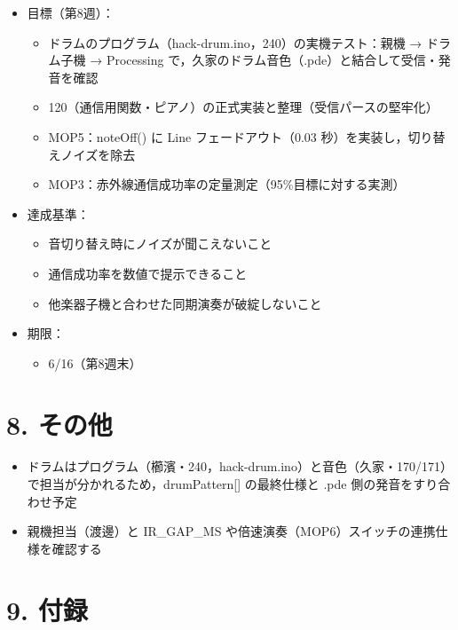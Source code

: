 \documentclass[a4paper,11pt]{ltjsarticle}
\providecommand{\％}{\%}
\begin{document}
\begin{itemize}
    \item 目標（第8週）：
    \begin{itemize}
        \item ドラムのプログラム（hack-drum.ino，240）の実機テスト：親機 → ドラム子機 → Processing で，久家のドラム音色（.pde）と結合して受信・発音を確認
        \item 120（通信用関数・ピアノ）の正式実装と整理（受信パースの堅牢化）
        \item MOP5：noteOff() に Line フェードアウト（0.03 秒）を実装し，切り替えノイズを除去
        \item MOP3：赤外線通信成功率の定量測定（95\％目標に対する実測）
    \end{itemize}
    \item 達成基準：
    \begin{itemize}
        \item 音切り替え時にノイズが聞こえないこと
        \item 通信成功率を数値で提示できること
        \item 他楽器子機と合わせた同期演奏が破綻しないこと
    \end{itemize}
    \item 期限：
    \begin{itemize}
        \item 6/16（第8週末）
    \end{itemize}
\end{itemize}

\section{8. その他}

\begin{itemize}
    \item ドラムはプログラム（櫛濱・240，hack-drum.ino）と音色（久家・170/171）で担当が分かれるため，drumPattern[] の最終仕様と .pde 側の発音をすり合わせ予定
    \item 親機担当（渡邊）と IR\_GAP\_MS や倍速演奏（MOP6）スイッチの連携仕様を確認する
\end{itemize}

\section{9. 付録}
\end{document}
